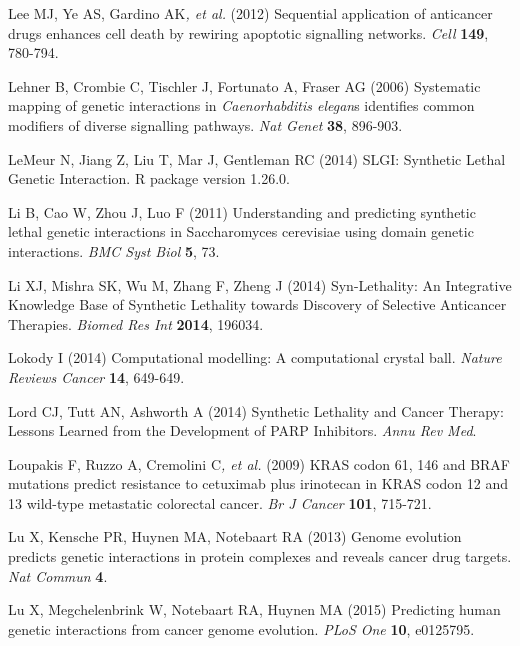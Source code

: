Lee MJ, Ye AS, Gardino AK\textit{, et al.} (2012) Sequential application
of anticancer drugs enhances cell death by rewiring apoptotic signalling
networks. \textit{Cell} \textbf{149}, 780-794.



Lehner B, Crombie C, Tischler J, Fortunato A, Fraser AG (2006)
Systematic mapping of genetic interactions in \textit{Caenorhabditis
elegan}s identifies common modifiers of diverse signalling pathways.
\textit{Nat Genet} \textbf{38}, 896-903.



\hypertarget{ENREF67}{}LeMeur N, Jiang Z, Liu T, Mar J, Gentleman RC
(2014) SLGI: Synthetic Lethal Genetic Interaction. R package version
1.26.0.



\hypertarget{ENREF68}{}Li B, Cao W, Zhou J, Luo F (2011) Understanding
and predicting synthetic lethal genetic interactions in Saccharomyces
cerevisiae using domain genetic interactions. \textit{BMC Syst Biol}
\textbf{5}, 73.



\hypertarget{ENREF69}{}Li XJ, Mishra SK, Wu M, Zhang F, Zheng J (2014)
Syn-Lethality: An Integrative Knowledge Base of Synthetic Lethality
towards Discovery of Selective Anticancer Therapies. \textit{Biomed Res
Int} \textbf{2014}, 196034.



\hypertarget{ENREF70}{}Lokody I (2014) Computational modelling: A
computational crystal ball. \textit{Nature Reviews Cancer} \textbf{14},
649-649.



Lord CJ, Tutt AN, Ashworth A (2014) Synthetic Lethality and Cancer
Therapy: Lessons Learned from the Development of PARP Inhibitors.
\textit{Annu Rev Med}.



Loupakis F, Ruzzo A, Cremolini C\textit{, et al.} (2009) KRAS codon 61,
146 and BRAF mutations predict resistance to cetuximab plus irinotecan
in KRAS codon 12 and 13 wild-type metastatic colorectal cancer.
\textit{Br J Cancer} \textbf{101}, 715-721.



\hypertarget{ENREF73}{}Lu X, Kensche PR, Huynen MA, Notebaart RA (2013)
Genome evolution predicts genetic interactions in protein complexes and
reveals cancer drug targets. \textit{Nat Commun} \textbf{4}.



\hypertarget{ENREF74}{}Lu X, Megchelenbrink W, Notebaart RA, Huynen MA
(2015) Predicting human genetic interactions from cancer genome
evolution. \textit{PLoS One} \textbf{10}, e0125795.



